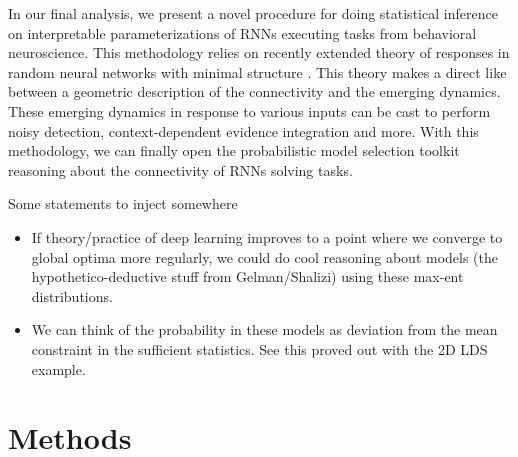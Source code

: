 \documentclass[11pt]{article}
\begin{document}
In our final analysis, we present a novel procedure for doing statistical inference on interpretable parameterizations of RNNs executing tasks from behavioral neuroscience.  This methodology relies on recently extended theory of responses in random neural networks with minimal structure \cite{mastrogiuseppe2018linking}.  This theory makes a direct like between a geometric description of the connectivity and the emerging dynamics.  These emerging dynamics in response to various inputs can be cast to perform noisy detection, context-dependent evidence integration and more.  With this methodology, we can finally open the probabilistic model selection toolkit reasoning about the connectivity of RNNs solving tasks.

Some statements to inject somewhere
\begin{itemize}
\item If theory/practice of deep learning improves to a point where we converge to global optima more regularly, we could do cool reasoning about models (the hypothetico-deductive stuff from Gelman/Shalizi) using these max-ent distributions.
\item We can think of the probability in these models as deviation from the mean constraint in the sufficient statistics.  See this proved out with the 2D LDS example.
\end{itemize}






\appendix

\section{Methods}
\end{document}
